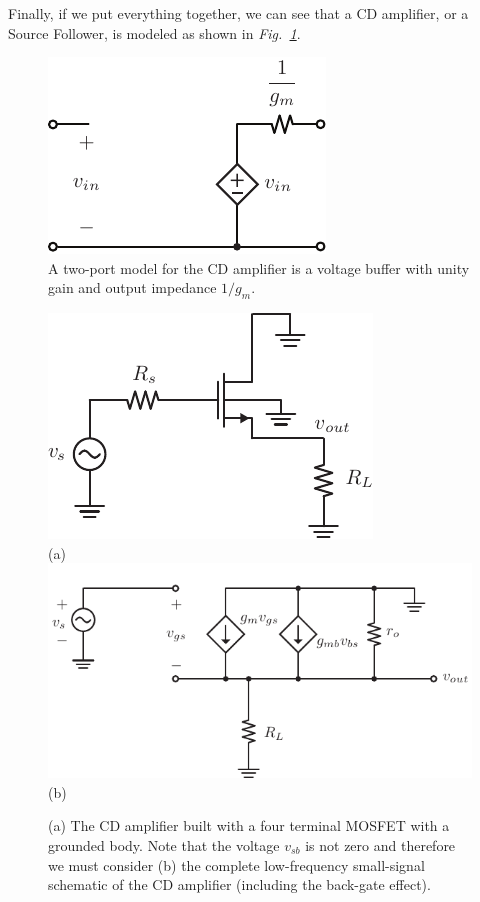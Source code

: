 Finally, if we put everything together, we can see that a CD amplifier, or a Source Follower, is modeled as shown in \emph{Fig.~\ref{fig:cd_amp_model}}.  
\begin{figure}[H]
\centering
\includegraphics[scale=1.15]{cd_amp_model}
\caption{A two-port model for the CD amplifier is a voltage buffer with unity gain and output impedance $1/g_m$.}
\label{fig:cd_amp_model}
\end{figure}
\newpage
\begin{figure}[t]
\centering
\includegraphics[scale=1.35]{cd_amp_ac_body}\\
(a)\\
\includegraphics[scale=1.25]{cd_amp_ss_av_body 2}\\
(b)\\
\caption{(a) The CD amplifier built with a four terminal MOSFET with a grounded body.  Note that the voltage $v_{sb}$ is not zero and therefore we must consider (b) the complete low-frequency small-signal schematic of the CD amplifier (including the back-gate effect).}
\label{fig:cd_amp_ac_body}
\end{figure}
